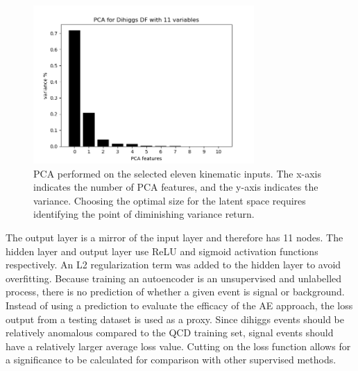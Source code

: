 \begin{figure}[!h] 
\begin{center}
\includegraphics*[width=0.75\textwidth] {AE/figures/ae_PCA_11vars}
\caption{PCA performed on the selected eleven kinematic inputs. The x-axis indicates the number of PCA features, and the y-axis indicates the variance. Choosing the optimal size for the latent space requires identifying the point of diminishing variance return.}
  \label{fig:ae_pca}
\end{center}
\end{figure}

The output layer is a mirror of the input layer and therefore has 11 nodes. The hidden layer and output layer use ReLU and sigmoid activation functions respectively. An L2 regularization term was added to the hidden layer to avoid overfitting. %
Because training an autoencoder is an unsupervised and unlabelled process, there is no prediction of whether a given event is signal or background. Instead of using a prediction to evaluate the efficacy of the AE approach, the loss output from a testing dataset is used as a proxy. Since dihiggs events should be relatively anomalous compared to the QCD training set, signal events should have a relatively larger average loss value. Cutting on the loss function allows for a significance to be calculated for comparison with other supervised methods.

